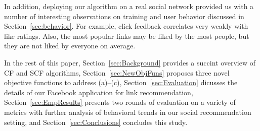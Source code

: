 In addition, deploying our algorithm on a real social network provided
us with a number of interesting observations on training and user
behavior discussed in Section~\ref{sec:behavior}.  For example, click
feedback correlates very weakly with like ratings.
Also, the most popular links may be liked by the most people, but they
are not liked by everyone on average.

In the rest of this paper, Section~\ref{sec:Background} provides a
succint overview of CF and SCF algorithms,
Section~\ref{sec:NewObjFuns} proposes three novel objective functions
to address (a)--(c), Section~\ref{sec:Evaluation} dicusses the details
of our Facebook application for link recommendation,
Section~\ref{sec:EmpResults} presents two rounds of evaluation on a
variety of metrics with further analysis of behavioral trends in our
social recommendation setting, and Section~\ref{sec:Conclusions}
concludes this study.

